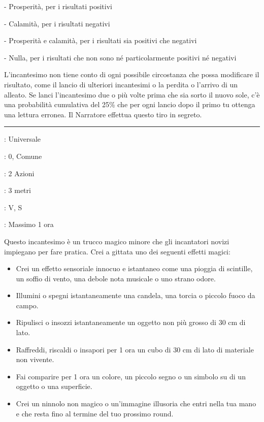 \begin{multicols}{2}
\medskip

- Prosperità, per i risultati positivi

- Calamità, per i risultati negativi

- Prosperità e calamità, per i risultati sia positivi che negativi

- Nulla, per i risultati che non sono né particolarmente positivi né negativi

L'incantesimo non tiene conto di ogni possibile circostanza che possa modificare il risultato, come il lancio di ulteriori incantesimi o la perdita o l'arrivo di un alleato. Se lanci l'incantesimo due o più volte prima che sia sorto il nuovo sole, c'è una probabilità cumulativa del 25\% che per ogni lancio dopo il primo tu ottenga una lettura erronea. Il Narratore effettua questo tiro in segreto.

\smallskip\noindent\rule{\linewidth}{2pt} \hypertarget{Prestidigitazione}{}\medskip{}
\noindent
\begin{description}[noitemsep, topsep=0pt, parsep=0pt, partopsep=0pt, leftmargin=0cm, labelwidth=2.8cm]
	\item[\textbf{Lista di Magia}]: Universale
	\item[\textbf{Livello}]: 0, Comune
	\item[\textbf{T. di Lancio}]: 2 Azioni
	\item[\textbf{Gittata}]: 3 metri
	\item[\textbf{Componenti}]: V, S
	\item[\textbf{Durata}]: Massimo 1 ora
\end{description}

Questo incantesimo è un trucco magico minore che gli incantatori novizi impiegano per fare pratica. Crei a gittata uno dei seguenti effetti magici:

\begin{itemize}[leftmargin=*] \setlength{\itemsep}{0pt}
	\item Crei un effetto sensoriale innocuo e istantaneo come una pioggia di scintille, un soffio di vento, una debole nota musicale o uno strano odore.
	\item Illumini o spegni istantaneamente una candela, una torcia o piccolo fuoco da campo.
	\item Ripulisci o insozzi istantaneamente un oggetto non più grosso di 30 cm di lato.
	\item Raffreddi, riscaldi o insapori per 1 ora un cubo di 30 cm di lato di materiale non vivente.
	\item Fai comparire per 1 ora un colore, un piccolo segno o un simbolo su di un oggetto o una superficie.
	\item Crei un ninnolo non magico o un'immagine illusoria che entri nella tua mano e che resta fino al termine del tuo prossimo round.
\end{itemize}


\end{multicols}
